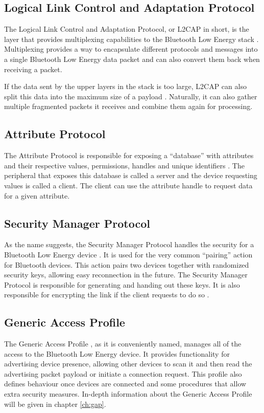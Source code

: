 \documentclass[pdftex,a4paper,12pt,twoside]{report}
\begin{document}
\subsection{Logical Link Control and Adaptation Protocol}
\label{subsec:hostL2CAP}
The Logical Link Control and Adaptation Protocol, or L2CAP in short, is the layer that provides multiplexing capabilities to the Bluetooth Low Energy stack \citep{bluetooth2016training}. Multiplexing provides a way to encapsulate different protocols and messages into a single Bluetooth Low Energy data packet and can also convert them back when receiving a packet.

If the data sent by the upper layers in the stack is too large, L2CAP can also split this data into the maximum size of a payload \citep{heydon2012bluetooth}. Naturally, it can also gather multiple fragmented packets it receives and combine them again for processing.

\subsection{Attribute Protocol}
\label{subsec:hostATT}
The Attribute Protocol is responsible for exposing a ``database'' with attributes and their respective values, permissions, handles and unique identifiers \citep{Townsend2014}. The peripheral that exposes this database is called a server and the device requesting values is called a client. The client can use the attribute handle to request data for a given attribute.

\subsection{Security Manager Protocol}
\label{subsec:hostSMP}
As the name suggests, the Security Manager Protocol handles the security for a Bluetooth Low Energy device \citep{Townsend2014}. It is used for the very common ``pairing'' action for Bluetooth devices. This action pairs two devices together with randomized security keys, allowing easy reconnection in the future. The Security Manager Protocol is responsible for generating and handing out these keys. It is also responsible for encrypting the link if the client requests to do so \citep{heydon2012bluetooth}.

\subsection{Generic Access Profile}
\label{subsec:hostGAP}
The Generic Access Profile \citep{bluetooth2016training}, as it is conveniently named, manages all of the access to the Bluetooth Low Energy device. It provides functionality for advertising device presence, allowing other devices to scan it and then read the advertising packet payload or initiate a connection request. This profile also defines behaviour once devices are connected and some procedures that allow extra security measures. In-depth information about the Generic Access Profile will be given in chapter \ref{ch:gap}.
\end{document}
